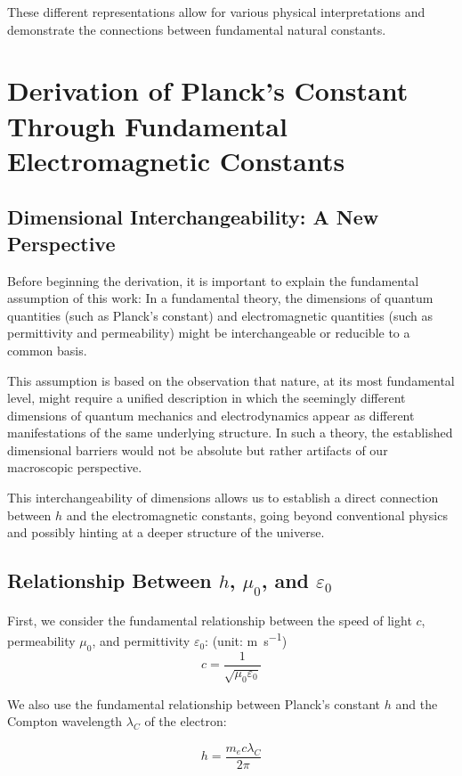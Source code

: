\documentclass{article}
\begin{document}
	These different representations allow for various physical interpretations and demonstrate the connections between fundamental natural constants.
	
	
	\section{Derivation of Planck's Constant Through Fundamental Electromagnetic Constants}
	
	\subsection{Dimensional Interchangeability: A New Perspective}
	
	Before beginning the derivation, it is important to explain the fundamental assumption of this work: In a fundamental theory, the dimensions of quantum quantities (such as Planck's constant) and electromagnetic quantities (such as permittivity and permeability) might be interchangeable or reducible to a common basis.
	
	This assumption is based on the observation that nature, at its most fundamental level, might require a unified description in which the seemingly different dimensions of quantum mechanics and electrodynamics appear as different manifestations of the same underlying structure. In such a theory, the established dimensional barriers would not be absolute but rather artifacts of our macroscopic perspective.
	
	This interchangeability of dimensions allows us to establish a direct connection between $h$ and the electromagnetic constants, going beyond conventional physics and possibly hinting at a deeper structure of the universe.
	
	\subsection{Relationship Between $h$, $\mu_0$, and $\varepsilon_0$}
	
	First, we consider the fundamental relationship between the speed of light $c$, permeability $\mu_0$, and permittivity $\varepsilon_0$:
	(unit: \si{\meter\per\second})
	$$c = \frac{1}{\sqrt{\mu_0\varepsilon_0}}$$
	
	We also use the fundamental relationship between Planck's constant $h$ and the Compton wavelength $\lambda_C$ of the electron:
	
	$$h = \frac{m_e c \lambda_C}{2\pi}$$
	
\end{document}
